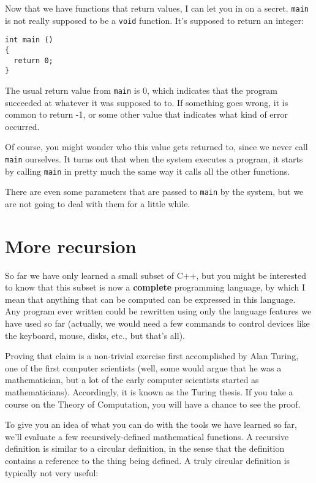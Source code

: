 Now that we have functions that return values, I can let you in
on a secret.  {\tt main} is not really supposed to be a {\tt void}
function.  It's supposed to return an integer:

\begin{verbatim}
int main ()
{
  return 0;
}  
\end{verbatim}
%
The usual return value from {\tt main} is 0, which indicates that
the program succeeded at whatever it was supposed to to.  If something
goes wrong, it is common to return -1, or some other value that
indicates what kind of error occurred.

Of course, you might wonder who this value gets returned to, since
we never call {\tt main} ourselves.  It turns out that when the
system executes a program, it starts by calling {\tt main}
in pretty much the same way it calls all the other functions.

There are even some parameters that are passed to {\tt main}
by the system, but we are not going to deal with them for a little
while.

\section {More recursion}

So far we have only learned a small subset of C++, but you
might be interested to know that this subset is now
a {\bf complete} programming language, by which I
mean that anything that can be computed can be expressed in this
language.  Any program ever written could be rewritten
using only the language features we have used so far (actually, we
would need a few commands to control devices like the keyboard, mouse,
disks, etc., but that's all).


Proving that claim is a non-trivial exercise first
accomplished by Alan Turing, one of the first computer scientists
(well, some would argue that he was a mathematician, but a lot of the
early computer scientists started as mathematicians).  Accordingly, it
is known as the Turing thesis.  If you take a course on the Theory of
Computation, you will have a chance to see the proof.

To give you an idea of what you can do with the tools we have learned
so far, we'll evaluate a few recursively-defined
mathematical functions.  A recursive definition is similar to a
circular definition, in the sense that the definition contains a
reference to the thing being defined.  A truly circular definition is
typically not very useful:


